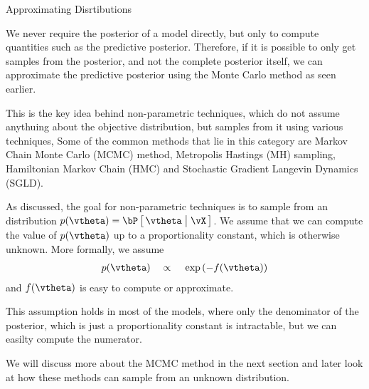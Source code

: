 \documentclass[11pt,a4paper]{article}
\begin{document}
\begin{ssection}{Approximating Disrtibutions}
\begin{enumerate}[label=\bt{\theenumi.}]

			We never require the posterior of a model directly, but only to compute quantities such as the predictive posterior. Therefore, if it is possible to only get samples from the posterior, and not the complete posterior itself, we can approximate the predictive posterior using the Monte Carlo method as seen earlier.

			This is the key idea behind non-parametric techniques, which do not assume anythuing about the objective distribution, but samples from it using various techniques, Some of the common methods that lie in this category are Markov Chain Monte Carlo (MCMC) method, Metropolis Hastings (MH) sampling, Hamiltonian Markov Chain (HMC) and Stochastic Gradient Langevin Dynamics (SGLD).

			As discussed, the goal for non-parametric techniques is to sample from an distribution $p(\vtheta) = \prob{\vtheta \pipe \vX}$. We assume that we can compute the value of $p(\vtheta)$ up to a proportionality constant, which is otherwise unknown. More formally, we assume
			\begin{align*}
				p(\vtheta) \qprop \texp{- f(\vtheta)}
			\end{align*}
			and $f(\vtheta)$ is easy to compute or approximate.

			This assumption holds in most of the models, where only the denominator of the posterior, which is just a proportionality constant is intractable, but we can easilty compute the numerator.

			We will discuss more about the MCMC method in the next section and later look at how these methods can sample from an unknown distribution.

	\end{enumerate}

\end{ssection}
\end{document}
